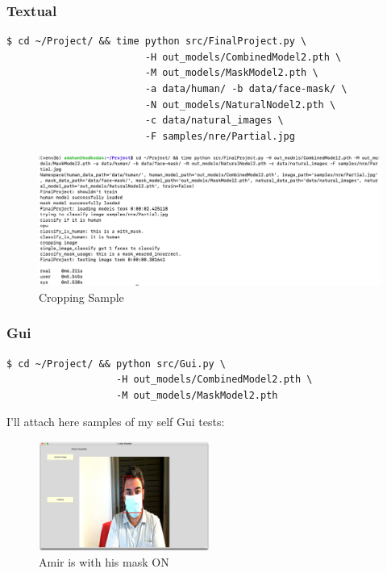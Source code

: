 \subsubsection{Textual}
\begin{verbatim}
$ cd ~/Project/ && time python src/FinalProject.py \
                        -H out_models/CombinedModel2.pth \
                        -M out_models/MaskModel2.pth \
                        -a data/human/ -b data/face-mask/ \
                        -N out_models/NaturalNodel2.pth \
                        -c data/natural_images \
                        -F samples/nre/Partial.jpg
\end{verbatim}
\begin{figure}[H]
    \centering
    \includegraphics[width=1\textwidth]{images/Demo/Textual.png}
    \caption{Cropping Sample}
    \label{fig:Textual}
\end{figure}
\subsubsection{Gui}
\begin{verbatim}
$ cd ~/Project/ && python src/Gui.py \
                   -H out_models/CombinedModel2.pth \
                   -M out_models/MaskModel2.pth
\end{verbatim}
I'll attach here samples of my self Gui tests:
\begin{figure}[H]
    \centering
    \includegraphics[width=0.5\textwidth]{images/Demo/Masked.png}
    \caption{Amir is with his mask ON}
    \label{fig:MaskedAmir}
\end{figure}

